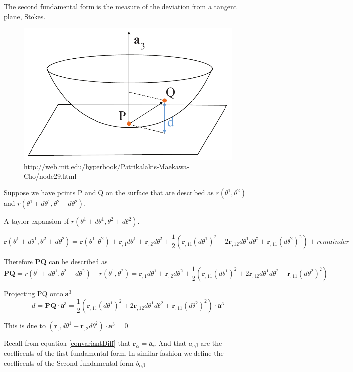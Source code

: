 The second fundamental form is the measure of the deviation from a tangent plane, Stokes.

\begin{figure}[H]
\centering
\includegraphics[width = 0.7\linewidth ]{figure/Theory/SecondFFil.pdf}
\caption{http://web.mit.edu/hyperbook/Patrikalakis-Maekawa-Cho/node29.html}
\end{figure}

Suppose we have points P and Q on the surface that are described as $r(\theta^1, \theta^2)$ and $r(\theta^1 + d\theta^1, \theta^2 + d\theta^2)$.

A taylor expansion of $r(\theta^1 + d\theta^1, \theta^2 + d\theta^2)$.

$$
\textbf{r}(\theta^1 + d\theta^1, \theta^2 + d\theta^2)= \textbf{r}(\theta^1, \theta^2) + \textbf{r}_{,1} d\theta^1 + \textbf{r}_{,2} d\theta^2 + \frac{1}{2}(\textbf{r}_{,11}(d\theta^1)^2 + 2\textbf{r}_{,12}d\theta^1 d\theta^2 + \textbf{r}_{,11}(d\theta^2)^2) + remainder
$$

Therefore \textbf{PQ} can be described as
$$
\textbf{PQ} = r(\theta^1 + d\theta^1, \theta^2 + d\theta^2) - r(\theta^1, \theta^2) =  \textbf{r}_{,1} d\theta^1 + \textbf{r}_{,2} d\theta^2 + \frac{1}{2}(\textbf{r}_{,11}(d\theta^1)^2 + 2\textbf{r}_{,12}d\theta^1 d\theta^2 + \textbf{r}_{,11}(d\theta^2)^2) 
$$

Projecting PQ onto $\textbf{a}^3$ 
$$
d = \textbf{PQ}\cdot\textbf{a}^3 = \frac{1}{2}(\textbf{r}_{,11}(d\theta^1)^2 + 2\textbf{r}_{,12}d\theta^1 d\theta^2 + \textbf{r}_{,11}(d\theta^2)^2) \cdot \textbf{a}^3 
$$

This is due to $(\textbf{r}_{,1} d\theta^1 + \textbf{r}_{,2}d\theta^2)\cdot\textbf{a}^3 = 0$

Recall from equation \ref{convariantDiff} that $\textbf{r}_\alpha = \textbf{a}_\alpha$ And that $a_{\alpha\beta}$ are the coefficents of the first fundamental form. In similar fashion we define the coefficents of the Second fundamental form $b_{\alpha\beta}$ 

